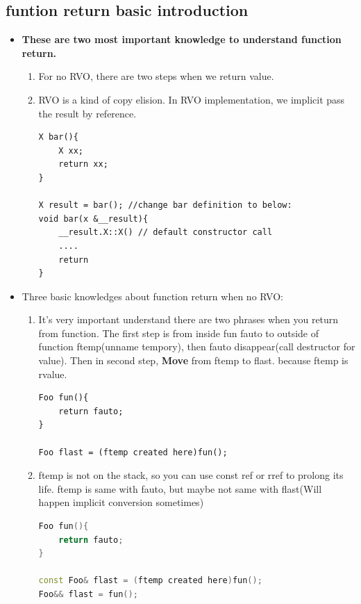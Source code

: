 \documentclass[a4paper,11pt,twoside]{book}
\begin{document}
\subsection{funtion return basic introduction}
\begin{itemize}
	\item \textbf{These are two most important knowledge to understand function return.}
	\begin{enumerate}
		\item For no RVO, there are two steps when we return value.
		\item RVO is a kind of copy elision. In RVO implementation, we implicit pass the result by reference.
\begin{lstlisting}
X bar(){
	X xx;
	return xx;
}
	
X result = bar(); //change bar definition to below:
void bar(x &__result){
	__result.X::X() // default constructor call
	....
	return
}
\end{lstlisting}

	\end{enumerate}
	
	\item Three basic knowledges about function return when no RVO:
	\begin{enumerate}
		\item It's very important understand there are two phrases when you return from function. The first step  is from inside fun fauto to outside of function ftemp(unname tempory), then fauto disappear(call destructor for value).  Then in second step, \textbf{Move} from ftemp to flast. because ftemp is rvalue.
\begin{lstlisting}[numbers=none]
Foo fun(){
	return fauto;
}
		
Foo flast = (ftemp created here)fun();
\end{lstlisting}
		\item ftemp is not on the stack, so you can use const ref or rref to prolong its life. ftemp is same with fauto, but maybe not same with flast(Will happen implicit conversion sometimes)
\begin{lstlisting}[frame=single, language=c++]
Foo fun(){
	return fauto;
}
		
const Foo& flast = (ftemp created here)fun();
Foo&& flast = fun();
\end{lstlisting}

	\end{enumerate}
	
	\end{itemize}
\end{document}
